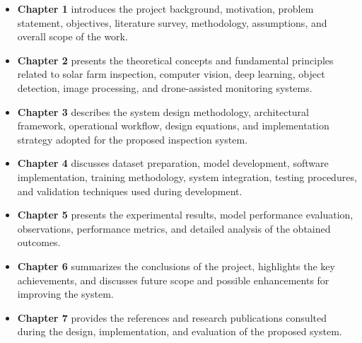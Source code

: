 \begin{itemize}

\item \textbf{Chapter 1} introduces the project background, motivation, problem statement, objectives, literature survey, methodology, assumptions, and overall scope of the work.

\item \textbf{Chapter 2} presents the theoretical concepts and fundamental principles related to solar farm inspection, computer vision, deep learning, object detection, image processing, and drone-assisted monitoring systems.

\item \textbf{Chapter 3} describes the system design methodology, architectural framework, operational workflow, design equations, and implementation strategy adopted for the proposed inspection system.

\item \textbf{Chapter 4} discusses dataset preparation, model development, software implementation, training methodology, system integration, testing procedures, and validation techniques used during development.

\item \textbf{Chapter 5} presents the experimental results, model performance evaluation, observations, performance metrics, and detailed analysis of the obtained outcomes.

\item \textbf{Chapter 6} summarizes the conclusions of the project, highlights the key achievements, and discusses future scope and possible enhancements for improving the system.

\item \textbf{Chapter 7} provides the references and research publications consulted during the design, implementation, and evaluation of the proposed system.

\end{itemize}
